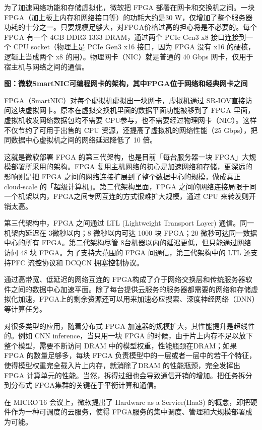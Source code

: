 为了加速网络功能和存储虚拟化，微软把 FPGA 部署在网卡和交换机之间。一块 FPGA（加上板上内存和网络接口等）的功耗大约是30 W，仅增加了整个服务器功耗的十分之一。只要规模足够大，对FPGA价格过高的担心将是不必要的。每个 FPGA 有一个 4GB DDR3-1333 DRAM，通过两个 PCIe Gen3 x8 接口连接到一个 CPU socket（物理上是 PCIe Gen3 x16 接口，因为 FPGA 没有 x16 的硬核，逻辑上当成两个 x8 的用）。物理网卡（NIC）就是普通的 40 Gbps 网卡，仅用于宿主机与网络之间的通信。


\textbf{图：微软SmartNIC可编程网卡的架构，其中FPGA位于网络和经典网卡之间}

FPGA（SmartNIC）对每个虚拟机虚拟出一块网卡，虚拟机通过 SR-IOV直接访问这块虚拟网卡。原本在虚拟交换机里面的数据平面功能被移到了 FPGA 里面，虚拟机收发网络数据包均不需要 CPU参与，也不需要经过物理网卡（NIC）。这样不仅节约了可用于出售的 CPU 资源，还提高了虚拟机的网络性能（25 Gbps），把同数据中心虚拟机之间的网络延迟降低了 10 倍。

这就是微软部署 FPGA 的第三代架构，也是目前「每台服务器一块 FPGA」大规模部署所采用的架构。FPGA 复用主机网络的初心是加速网络和存储，更深远的影响则是把 FPGA 之间的网络连接扩展到了整个数据中心的规模，做成真正 cloud-scale 的「超级计算机」。第二代架构里面，FPGA 之间的网络连接局限于同一个机架以内，FPGA之间专网互连的方式很难扩大规模，通过 CPU 来转发则开销太高。

第三代架构中，FPGA 之间通过 LTL (Lightweight Transport Layer) 通信。同一机架内延迟在 3微秒以内；8 微秒以内可达 1000 块 FPGA；20 微秒可达同一数据中心的所有 FPGA。第二代架构尽管 8台机器以内的延迟更低，但只能通过网络访问 48 块 FPGA。为了支持大范围的 FPGA 间通信，第三代架构中的 LTL 还支持PFC 流控协议和 DCQCN 拥塞控制协议。

通过高带宽、低延迟的网络互连的 FPGA构成了介于网络交换层和传统服务器软件之间的数据中心加速平面。除了每台提供云服务的服务器都需要的网络和存储虚拟化加速，FPGA上的剩余资源还可以用来加速必应搜索、深度神经网络（DNN）等计算任务。

对很多类型的应用，随着分布式 FPGA 加速器的规模扩大，其性能提升是超线性的。例如 CNN inference，当只用一块 FPGA 的时候，由于片上内存不足以放下整个模型，需要不断访问 DRAM 中的模型权重，性能瓶颈在DRAM；如果 FPGA 的数量足够多，每块 FPGA 负责模型中的一层或者一层中的若干个特征，使得模型权重完全载入片上内存，就消除了DRAM 的性能瓶颈，完全发挥出 FPGA 计算单元的性能。当然，拆得过细也会导致通信开销的增加。把任务拆分到分布式 FPGA集群的关键在于平衡计算和通信。

在 MICRO’16 会议上，微软提出了 Hardware as a Service(HaaS) 的概念，即把硬件作为一种可调度的云服务，使得 FPGA服务的集中调度、管理和大规模部署成为可能。


